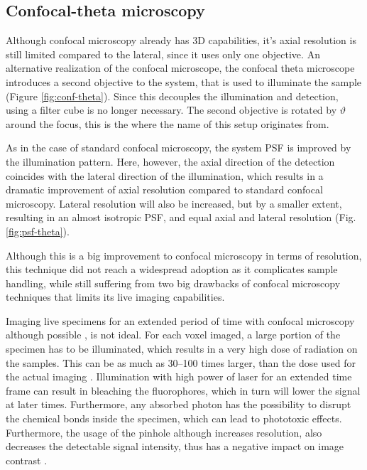   \subsection{Confocal-theta microscopy}

    Although confocal microscopy already has 3D capabilities, it's axial resolution is still limited compared to the lateral, since it uses only one objective. An alternative realization of the confocal microscope, the confocal theta microscope \cite{stelzer_fundamental_1994} introduces a second objective to the system, that is used to illuminate the sample (Figure \ref{fig:conf-theta}). Since this decouples the illumination and detection, using a filter cube is no longer necessary. The second objective is rotated by $\vartheta$ around the focus, this is the where the name of this setup originates from.

    As in the case of standard confocal microscopy, the system PSF is improved by the illumination pattern. Here, however, the axial direction of the detection coincides with the lateral direction of the illumination, which results in a dramatic improvement of axial resolution compared to standard confocal microscopy. Lateral resolution will also be increased, but by a smaller extent, resulting in an almost isotropic PSF, and equal axial and lateral resolution (Fig. \ref{fig:psf-theta}). 

    Although this is a big improvement to confocal microscopy in terms of resolution, this technique did not reach a widespread adoption as it complicates sample handling, while still suffering from two big drawbacks of confocal microscopy techniques that limits its live imaging capabilities.

    Imaging live specimens for an extended period of time with confocal microscopy although possible \cite{aldaz_live_2010}, is not ideal. For each voxel imaged, a large portion of the specimen has to be illuminated, which results in a very high dose of radiation on the samples. This can be as much as 30--100 times larger, than the dose used for the actual imaging \cite{reynaud_light_2008}. Illumination with high power of laser for an extended time frame can result in bleaching the fluorophores, which in turn will lower the signal at later times. Furthermore, any absorbed photon has the possibility to disrupt the chemical bonds inside the specimen, which can lead to phototoxic effects. Furthermore, the usage of the pinhole although increases resolution, also decreases the detectable signal intensity, thus has a negative impact on image contrast \cite{stelzer_contrast_1998}.



